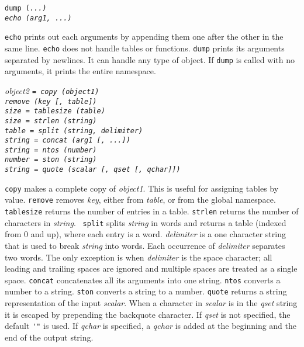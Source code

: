 \begin{flushleft}
\tt dump (\it ...\tt )\\
\tt echo (\it arg1, ...\tt )\\
\end{flushleft}\vspace{-2\itemsep}
{\tt echo} prints out each arguments by appending them one after the other in
the same line. {\tt echo} does not handle tables or functions. {\tt dump}
prints its arguments separated by newlines. It can handle any type of {\LEFTY}
object. If {\tt dump} is called with no arguments, it prints the entire
namespace.

\begin{flushleft}
\it object2 \tt = copy (\it object1\tt )\\
\tt remove (\it key [, table]\/\tt )\\
\it size \tt = tablesize (\it table\tt )\\
\it size \tt = strlen (\it string\tt )\\
\it table \tt = split (\it string, delimiter\tt )\\
\it string \tt = concat (\it arg1 [, ...]\/\tt )\\
\it string \tt = ntos (\it number\tt )\\
\it number \tt = ston (\it string\tt )\\
\it string \tt = quote (\it scalar [, qset [, qchar]]\/\tt )\\
\end{flushleft}\vspace{-2\itemsep}
{\tt copy} makes a complete copy of {\it object1}. This is useful for assigning
tables by value. {\tt remove} removes {\it key}, either from {\it table}, or
from the global namespace. {\tt tablesize} returns the number of entries in a
table. {\tt strlen} returns the number of characters in {\it string}.  {\tt
split} splits {\it string} in words and returns a table (indexed from 0 and
up), where each entry is a word. {\it delimiter} is a one character string that
is used to break {\it string} into words. Each occurrence of {\it delimiter}
separates two words. The only exception is when {\it delimiter} is the space
character; all leading and trailing spaces are ignored and multiple spaces are
treated as a single space. {\tt concat} concatenates all its arguments into one
string. {\tt ntos} converts a number to a string. {\tt ston} converts a
string to a number. {\tt quote} returns a string representation of the input
{\it scalar}. When a character in {\it scalar} is in the {\it qset} string it
is escaped by prepending the backquote character. If {\it qset} is
not specified, the default \verb+'"+ is used. If {\it qchar} is specified,
a {\it qchar} is added at the beginning and the end of the output string.

